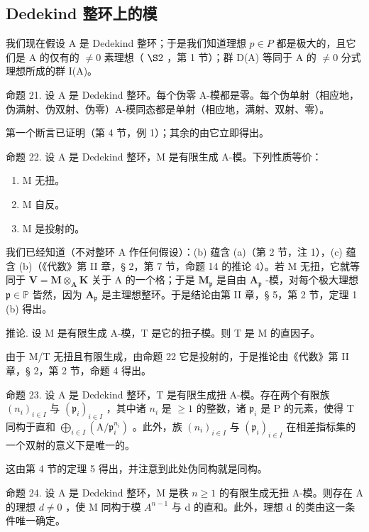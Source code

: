 \subsection{Dedekind 整环上的模}

我们现在假设 A 是 Dedekind 整环；于是我们知道理想 \(p \in P\) 都是极大的，且它们是 A 的仅有的 \(\neq 0\) 素理想（ \(\S 2\) ，第 1 节）；群 D(A) 等同于 A 的 \(\neq 0\) 分式理想所成的群 I(A)。

命题 21. 设 A 是 Dedekind 整环。每个伪零 A-模都是零。每个伪单射（相应地，伪满射、伪双射、伪零）A-模同态都是单射（相应地，满射、双射、零）。

第一个断言已证明（第 4 节，例 1）；其余的由它立即得出。

命题 22. 设 A 是 Dedekind 整环，M 是有限生成 A-模。下列性质等价：

\begin{enumerate}
\def\labelenumi{(\alph{enumi})}
\item
  M 无扭。
\item
  M 自反。
\item
  M 是投射的。
\end{enumerate}

我们已经知道（不对整环 A 作任何假设）：(b) 蕴含 (a)（第 2 节，注 1），(c) 蕴含 (b)（《代数》第 II 章，§ 2，第 7 节，命题 14 的推论 4）。若 M 无扭，它就等同于 \(\mathbf{V} = \mathbf{M} \otimes_{\mathbf{A}} \mathbf{K}\) 关于 A 的一个格；于是 \(\mathbf{M}_{\mathfrak{p}}\) 是自由 \(\mathbf{A}_{\mathfrak{p}}\) -模，对每个极大理想 \(\mathfrak{p} \in \mathbb{P}\) 皆然，因为 \(\mathbf{A}_{\mathfrak{p}}\) 是主理想整环。于是结论由第 II 章，§ 5，第 2 节，定理 1 (b) 得出。

推论. 设 M 是有限生成 A-模，T 是它的扭子模。则 T 是 M 的直因子。

由于 M/T 无扭且有限生成，由命题 22 它是投射的，于是推论由《代数》第 II 章，§ 2，第 2 节，命题 4 得出。

命题 23. 设 A 是 Dedekind 整环，T 是有限生成扭 A-模。存在两个有限族 \((n_{i})_{i\in I}\) 与 \((\mathfrak{p}_i)_{i\in I}\) ，其中诸 \(n_i\) 是 \(\geqslant 1\) 的整数，诸 \(\mathfrak{p}_i\) 是 P 的元素，使得 T 同构于直和 \(\bigoplus_{i\in I} (\mathrm{A} / \mathfrak{p}_{i}^{n_i})\) 。此外，族 \((n_{i})_{i\in I}\) 与 \((\mathfrak{p}_i)_{i\in I}\) 在相差指标集的一个双射的意义下是唯一的。

这由第 4 节的定理 5 得出，并注意到此处伪同构就是同构。

命题 24. 设 A 是 Dedekind 整环，M 是秩 \(n \geqslant 1\) 的有限生成无扭 A-模。则存在 A 的理想 \(d \neq 0\) ，使 M 同构于模 \(A^{n-1}\) 与 d 的直和。此外，理想 d 的类由这一条件唯一确定。

